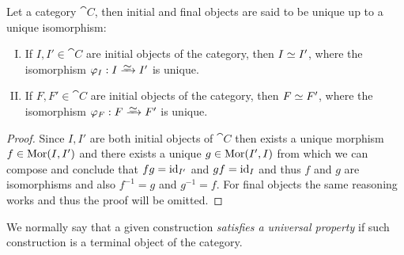 \begin{proposition}\label{prop:initial-final-unique}
    Let a category \(\cat{C}\), then initial and final objects are said to be
    unique up to a unique isomorphism:
    \begin{enumerate}[I.]
        \item If \(I, I' \in \cat{C}\) are initial objects of the
              category, then \(I \simeq I'\), where the isomorphism \(\varphi_I: I
              \isoto I'\) is unique.
        \item If \(F, F' \in \cat{C}\) are initial objects of the
              category, then \(F \simeq F'\), where the isomorphism \(\varphi_F: F
              \isoto F'\) is unique.
    \end{enumerate}
\end{proposition}

\begin{proof}
    Since \(I, I'\) are both initial objects of \(\cat{C}\) then exists a unique
    morphism \(f \in \operatorname{Mor}(I, I')\) and there exists a unique \(g \in \operatorname{Mor}(I',
    I)\) from which we can compose and conclude that \(f g = \operatorname{id}_{I'}\) and \(gf =
    \operatorname{id}_{I}\) and thus \(f\) and \(g\) are isomorphisms and also \(f^{-1} = g\) and
    \(g^{-1} = f\).  For final objects the same reasoning works and thus the proof
    will be omitted.
\end{proof}

We normally say that a given construction \emph{satisfies a universal property}
if such construction is a terminal object of the category.